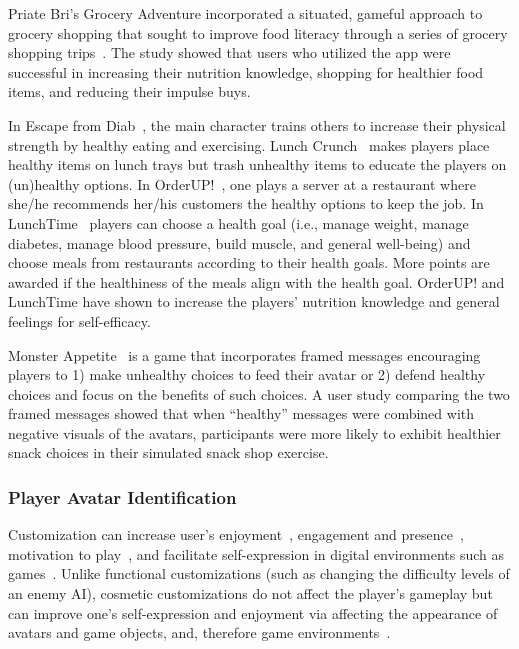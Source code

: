 Priate Bri's Grocery Adventure incorporated a situated, gameful approach to grocery shopping that sought to improve food literacy through a series of grocery shopping trips~\cite{bomfim2018pirate,bomfim2020food}. The study showed that users who utilized the app were successful in increasing their nutrition knowledge, shopping for healthier food items, and reducing their impulse buys. 

In Escape from Diab~\cite{thompson2008serious}, the main character trains others to increase their physical strength by healthy eating and exercising. Lunch Crunch~\cite{lunchcrunch} makes players place healthy items on lunch trays but trash unhealthy items to educate the players on (un)healthy options. In OrderUP!~\cite{grimes2010let}, one plays a server at a restaurant where she/he recommends her/his customers the healthy options to keep the job. In LunchTime~\cite{orji2013lunchtime} players can choose a health goal (i.e., manage weight, manage diabetes, manage blood pressure, build muscle, and general well-being) and choose meals from restaurants according to their health goals. More points are awarded if the healthiness of the meals align with the health goal. OrderUP! and LunchTime have shown to increase the players' nutrition knowledge and general feelings for self-efficacy. 

Monster Appetite~\cite{hwang2017monster} is a game that incorporates framed messages encouraging players to 1) make unhealthy choices to feed their avatar or 2) defend healthy choices and focus on the benefits of such choices. A user study comparing the two framed messages showed that when ``healthy'' messages were combined with negative visuals of the avatars, participants were more likely to exhibit healthier snack choices in their simulated snack shop exercise. 



\vspace{-5pt}
\subsubsection{Player Avatar Identification}
Customization can increase user's enjoyment~\cite{birk2016fostering,marathe2011drives,trepte2010avatar,turkay2015effects}, engagement and presence~\cite{ng2013examining}, motivation to play~\cite{turkay2015effects}, and facilitate self-expression in digital environments such as games~\cite{adinolf2011controlling,bailey2009avatar}. Unlike functional customizations (such as changing the difficulty levels of an enemy AI), cosmetic customizations do not affect the player's gameplay but can improve one's self-expression and enjoyment via affecting the appearance of avatars and game objects, and, therefore game environments~\cite{cuthbert2019effects,turkay2014effects}.  

